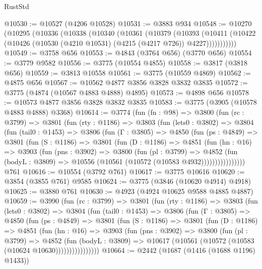 \begin{lexlean}{RustStd}
\begin{coremodule}
{\begin{coremodule}
{{{{{{{{{{{{{{{{{{{{{{{{{{{{{{{@10530 := @10527 (@4206 @10528)
@10531 := @3883 @934
@10548 := @10270
    (@10295
      (@10336
        (@10338
          (@10340
            (@10361
              (@10379
                (@10393
                  (@10411
                    (@10422 (@10426 (@10530 (@4210 @10531) (@4215 (@4217 @726)) @4227)))))))))))
@10549 := @3758 @656
@10553 := @4843 (@3764 @656) (@3770 @656)
@10554 := @3779 @9582
@10556 := @3775 (@10554 @4855)
@10558 := @3817 (@3818 @656)
@10559 := @3813 @10558
@10561 := @3775 (@10559 @4869)
@10562 := @4875 @656
@10567 := @10562 @4877 @3856 @3828 @3832 @3835
@10572 := @3775 (@4874 (@10567 @4883 @4888) @4895)
@10573 := @4898 @656
@10578 := @10573 @4877 @3856 @3828 @3832 @3835
@10583 := @3775 (@3905 (@10578 @4883 @4888) @3368)
@10614 := @3774
    (fun (fn : @98) =>
    @3800
      (fun (rc : @3799) =>
      @3801
        (fun (rty : @1186) =>
        @3803
          (fun (lets0 : @3802) =>
          @3804
            (fun (tail0 : @1453) =>
            @3806
              (fun (Γ : @3805) =>
              @4850
                (fun (ps : @4849) =>
                @3801
                  (fun (S : @1186) =>
                  @3801
                    (fun (D : @1186) =>
                    @4851
                      (fun (hn : @16) =>
                      @3903
                        (fun (pns : @3902) =>
                        @3800
                          (fun (pl : @3799) =>
                          @4852
                            (fun (bodyL : @3809) =>
                            @10556 (@10561 (@10572 (@10583 @4932))))))))))))))))
    @761
@10616 := @10554 (@3792 @761)
@10617 := @3775 @10616
@10620 := @3854 (@3855 @761) @9585
@10624 := @3775 (@3846 (@10620 @4914) @4918)
@10625 := @3880 @761
@10630 := @4923 (@4924 @10625 @9588 @4885 @4887)
@10659 := @3990
    (fun (rc : @3799) =>
    @3801
      (fun (rty : @1186) =>
      @3803
        (fun (lets0 : @3802) =>
        @3804
          (fun (tail0 : @1453) =>
          @3806
            (fun (Γ : @3805) =>
            @4850
              (fun (ps : @4849) =>
              @3801
                (fun (S : @1186) =>
                @3801
                  (fun (D : @1186) =>
                  @4851
                    (fun (hn : @16) =>
                    @3903
                      (fun (pns : @3902) =>
                      @3800
                        (fun (pl : @3799) =>
                        @4852
                          (fun (bodyL : @3809) =>
                          @10617 (@10561 (@10572 (@10583 (@10624 @10630))))))))))))))))
@10664 := @2442 (@1687 (@1416 (@1688 @1196) @1433))
}}}}}}}}}}}}}}}}}}}}}}}}}}}}}}}
\end{coremodule}}
\end{coremodule}
\end{lexlean}
